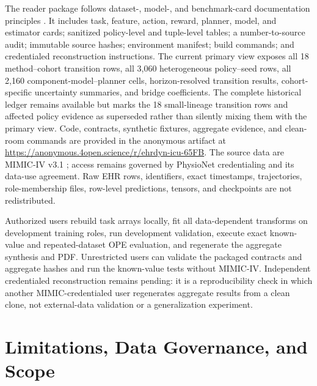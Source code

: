 \documentclass[sigconf,review]{acmart}
\begin{document}
The reader package follows dataset-, model-, and benchmark-card documentation principles \cite{gebru2021datasheets,mitchell2019model,pushkarna2022data}. It includes task, feature, action, reward, planner, model, and estimator cards; sanitized policy-level and tuple-level tables; a number-to-source audit; immutable source hashes; environment manifest; build commands; and credentialed reconstruction instructions. The current primary view exposes all 18 method--cohort transition rows, all 3,060 heterogeneous policy--seed rows, all 2,160 component-model--planner cells, horizon-resolved transition results, cohort-specific uncertainty summaries, and bridge coefficients. The complete historical ledger remains available but marks the 18 small-lineage transition rows and affected policy evidence as superseded rather than silently mixing them with the primary view. Code, contracts, synthetic fixtures, aggregate evidence, and clean-room commands are provided in the anonymous artifact at \url{https://anonymous.4open.science/r/ehrdyn-icu-65FB}. The source data are MIMIC-IV v3.1 \cite{johnson2023mimic}; access remains governed by PhysioNet credentialing and its data-use agreement. Raw EHR rows, identifiers, exact timestamps, trajectories, role-membership files, row-level predictions, tensors, and checkpoints are not redistributed.

Authorized users rebuild task arrays locally, fit all data-dependent transforms on development training roles, run development validation, execute exact known-value and repeated-dataset OPE evaluation, and regenerate the aggregate synthesis and PDF. Unrestricted users can validate the packaged contracts and aggregate hashes and run the known-value tests without MIMIC-IV. Independent credentialed reconstruction remains pending: it is a reproducibility check in which another MIMIC-credentialed user regenerates aggregate results from a clean clone, not external-data validation or a generalization experiment.

\section{Limitations, Data Governance, and Scope}
\end{document}
